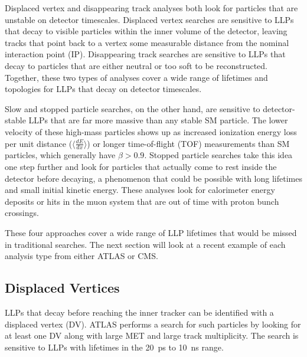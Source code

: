 \documentclass[12pt]{article}
\begin{document}
        Displaced vertex and disappearing track analyses both look for particles that are unstable on detector timescales. Displaced vertex searches are sensitive to LLPs that decay to visible particles within the inner volume  of the detector, leaving tracks that point back to a vertex some measurable distance from the nominal interaction point (IP). Disappearing track searches are sensitive to LLPs that decay to particles that are either neutral or too soft to be reconstructed. Together, these two types of analyses cover a wide range of lifetimes and topologies for LLPs that decay on detector timescales.

        Slow and stopped particle searches, on the other hand, are sensitive to detector-stable LLPs that are far more massive than any stable SM particle. The lower velocity of these high-mass particles shows up as increased ionization energy loss per unit distance ($\langle\frac{dE}{dx}\rangle$) or longer time-of-flight (TOF) measurements than SM particles, which generally have $\beta > \num{0.9}$. Stopped particle searches take this idea one step further and look for particles that actually come to rest inside the detector before decaying, a phenomenon that could be possible with long lifetimes and small initial kinetic energy. These analyses look for calorimeter energy deposits or hits in the muon system that are out of time with proton bunch crossings.

        These four approaches cover a wide range of LLP lifetimes that would be missed in traditional searches. The next section will look  at a recent example of each analysis type from either ATLAS or CMS.

    \subsection{Displaced Vertices}
        LLPs that decay before reaching the inner tracker can be identified with a displaced vertex (DV). ATLAS performs a search for such particles by looking for at least one DV along with large MET and large track multiplicity. The search is sensitive to LLPs with lifetimes in the \SI{20}{\pico\s} to \SI{10}{\nano\s} range.
\end{document}
